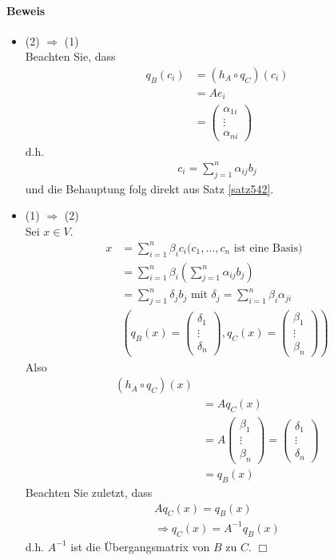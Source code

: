 \documentclass[11pt]{report}
\begin{document}
\paragraph{Beweis}
\begin{itemize}
\item (2) $\Rightarrow$ (1) \\
Beachten Sie, dass
\begin{align}
q_B (c_i) &= (h_A \circ q_C)(c_i) \\
 &= A e_i \\
 &= \begin{pmatrix} \alpha_{1i} \\ \vdots \\ \alpha_{ni}\end{pmatrix}
\end{align}
d.h. 
\begin{align}
c_i = \sum_{j=1}^{n} \alpha_{ij} b_j
\end{align}
und die Behauptung folg direkt aus Satz \ref{satz542}.
\item (1) $\Rightarrow$ (2) \\
Sei $x \in V$.
\begin{align}
x &= \sum_{i=1}^{n} \beta_i c_i (c_1, ..., c_n \text{ ist eine Basis)} \\
&= \sum_{i=1}^{n} \beta_i \left( \sum_{j=1}^{n} \alpha_{ij} b_j\right) \\
&= \sum_{j=1}^{n} \delta_j b_j \text{ mit } \delta_j = \sum_{i=1}^{n} \beta_i \alpha_{ji} \\
&\left( q_B(x) = \begin{pmatrix} \delta_1 \\ \vdots \\ \delta_n \end{pmatrix}, q_C(x) = \begin{pmatrix} \beta_1 \\ \vdots \\ \beta_n \end{pmatrix} \right)
\end{align}
Also
\begin{align}
(h_A \circ q_C)(x)&\\
&= A q_C(x) \\
&= A\begin{pmatrix} \beta_1 \\ \vdots \\ \beta_n\end{pmatrix} = \begin{pmatrix} \delta_1 \\ \vdots \\ \delta_n\end{pmatrix} \\
&= q_B(x)
\end{align}
Beachten Sie zuletzt, dass
\begin{align}
A q_C(x) = q_B(x) \\
\Rightarrow q_C(x) = A^{-1} q_B (x)
\end{align}
d.h. $A^{-1}$ ist die Übergangsmatrix von $B$ zu $C$.\hspace*{1cm} \hfill $\Box$
\end{itemize}
\end{document}
